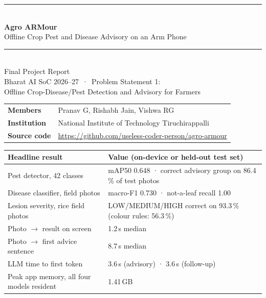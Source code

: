 \documentclass[11pt,a4paper]{article}
\begin{document}
\begin{titlepage}
\centering
\vspace*{2.2cm}
{\color{leaf}\rule{\linewidth}{1.2pt}}\\[14pt]
{\Huge\bfseries Agro ARMour}\\[8pt]
{\Large Offline Crop Pest and Disease Advisory on an Arm Phone}\\[14pt]
{\color{leaf}\rule{\linewidth}{1.2pt}}\\[22pt]
{\large Final Project Report}\\[4pt]
{\normalsize Bharat AI SoC 2026--27 \,·\, Problem Statement 1:\\ Offline Crop-Disease/Pest Detection and Advisory for Farmers}\\[40pt]

\begin{tabular}{ll}
\textbf{Members} & Pranav G, Rishabh Jain, Vishwa RG \\
\textbf{Institution} & National Institute of Technology Tiruchirappalli \\
\textbf{Source code} & \url{https://github.com/useless-coder-person/agro-armour} \\
\end{tabular}

\vfill
\begin{minipage}{0.86\linewidth}
\small
\begin{tabularx}{\linewidth}{@{}lL@{}}
\toprule
\textbf{Headline result} & \textbf{Value (on-device or held-out test set)} \\
\midrule
Pest detector, 42 classes & mAP50 0.648 · correct advisory group on 86.4\,\% of test photos \\
Disease classifier, field photos & macro-F1 0.730 · not-a-leaf recall 1.00 \\
Lesion severity, rice field photos & LOW/MEDIUM/HIGH correct on 93.3\,\% (colour rules: 56.3\,\%) \\
Photo $\rightarrow$ result on screen & 1.2\,s median \\
Photo $\rightarrow$ first advice sentence & 8.7\,s median \\
LLM time to first token & 3.6\,s (advisory) · 3.6\,s (follow-up) \\
Peak app memory, all four models resident & 1.41\,GB \\
\bottomrule
\end{tabularx}
\vspace{14pt}


\end{minipage}
\end{titlepage}
\end{document}

